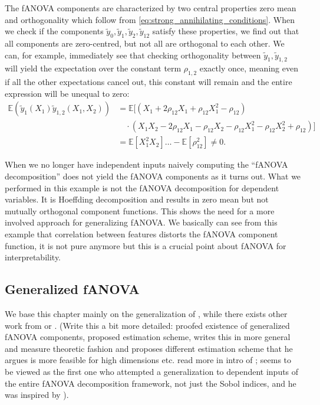 The fANOVA components are characterized by two central properties zero mean and orthogonality which follow from \autoref{eq:strong_annihilating_conditions}.
When we check if the components $\tilde{y}_0, \tilde{y}_1, \tilde{y}_2, \tilde{y}_{12}$ satisfy these properties, we find out that all components are zero-centred, but not all are orthogonal to each other. We can, for example, immediately see that checking orthogonality between $\tilde{y}_{1}, \tilde{y}_{1,2}$ will yield the expectation over the constant term $\rho_{1,2}$ exactly once, meaning even if all the other expectations cancel out, this constant will remain and the entire expression will be unequal to zero:
\begin{align*}
    \mathbb{E}(\tilde{y}_1(X_1)\tilde{y}_{1,2}(X_1, X_2)) 
    &= \mathbb{E}[(X_1 + 2\rho_{12}X_1 + \rho_{12}X_1^2 - \rho_{12}) \\
    &\quad \cdot (X_1 X_2 - 2\rho_{12} X_1 - \rho_{12} X_2 - \rho_{12} X_1^2 - \rho_{12} X_2^2 + \rho_{12})] \\
    &= \mathbb{E}[X_{1}^2X_2] \ldots - \mathbb{E}[\rho_{12}^2] \neq 0.
\end{align*}

When we no longer have independent inputs naively computing the ``fANOVA decomposition'' does not yield the fANOVA components as it turns out. What we performed in this example is not the fANOVA decomposition for dependent variables. It is Hoeffding decomposition \citep{hoeffding1948} and results in zero mean but not mutually orthogonal component functions. This shows the need for a more involved approach for generalizing fANOVA.
We basically can see from this example that correlation between features distorts the fANOVA component function, it is not pure anymore but this is a crucial point about fANOVA for interpretability.

\subsection{Generalized fANOVA}
We base this chapter mainly on the generalization of \cite{rahman2014}, while there exists other work from \cite{hooker2007} or \cite{chastaing2012}. (Write this a bit more detailed: \cite{hooker2007} proofed existence of generalized fANOVA components, proposed estimation scheme, \cite{rahman2014} writes this in more general and measure theoretic fashion and proposes different estimation scheme that he argues is more feasible for high dimensions etc. read more in intro of \cite{rahman2014}; \cite{hooker2007} seems to be viewed as the first one who attempted a generalization to dependent inputs of the entire fANOVA decomposition framework, not just the Sobol indices, and he was inspired by \cite{stone1994}).\par

